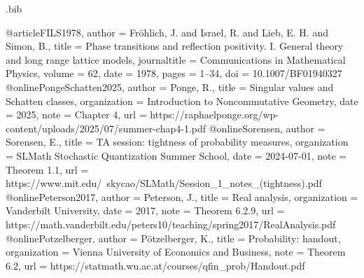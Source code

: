 \begin{filecontents*}[overwrite]{\jobname.bib}

@article{FILS1978,
  author = {Fr\"ohlich, J. and Israel, R. and Lieb, E. H. and Simon, B.},
  title = {Phase transitions and reflection positivity.
    {I}. General theory and long range lattice models},
  journaltitle = {Communications in Mathematical Physics},
  volume = {62}, date = {1978}, pages = {1--34},
  doi = {10.1007/BF01940327}
}
@online{PongeSchatten2025,
  author = {Ponge, R.},
  title = {Singular values and {Schatten} classes},
  organization = {Introduction to Noncommutative Geometry},
  date = {2025}, note = {Chapter 4},
  url = {https://raphaelponge.org/wp-content/uploads/2025/07/summer-chap4-1.pdf}
}
@online{Sorensen,
  author = {Sorensen, E.},
  title = {{TA} session: tightness of probability measures},
  organization = {SLMath Stochastic Quantization Summer School},
  date = {2024-07-01}, note = {Theorem 1.1},
  url = {https://www.mit.edu/~skycao/SLMath/Session_1_notes_(tightness).pdf}
}
@online{Peterson2017,
  author = {Peterson, J.}, title = {Real analysis},
  organization = {Vanderbilt University}, date = {2017},
  note = {Theorem 6.2.9},
  url = {https://math.vanderbilt.edu/peters10/teaching/spring2017/RealAnalysis.pdf}
}
@online{Potzelberger,
  author = {P\"otzelberger, K.}, title = {Probability: handout},
  organization = {Vienna University of Economics and Business},
  note = {Theorem 6.2},
  url = {https://statmath.wu.ac.at/courses/qfin_prob/Handout.pdf}
}
\end{filecontents*}
\documentclass[11pt,letterpaper,reqno]{amsart}
\makeatletter
{}[2020/10/01]

\RequirePackage[T1]{fontenc}
\RequirePackage{lmodern}
\RequirePackage{microtype}
\RequirePackage[letterpaper,margin=1in,headheight=15pt]{geometry}
\RequirePackage{amsmath,amsthm,amssymb,mathtools}
\RequirePackage{enumitem}
\RequirePackage{perpage}
\RequirePackage{xcolor}
\RequirePackage[breaklinks=true,colorlinks=true,
  linkcolor=manuscriptred,citecolor=manuscriptblue,urlcolor=manuscriptmagenta]{hyperref}
\RequirePackage{cleveref}

